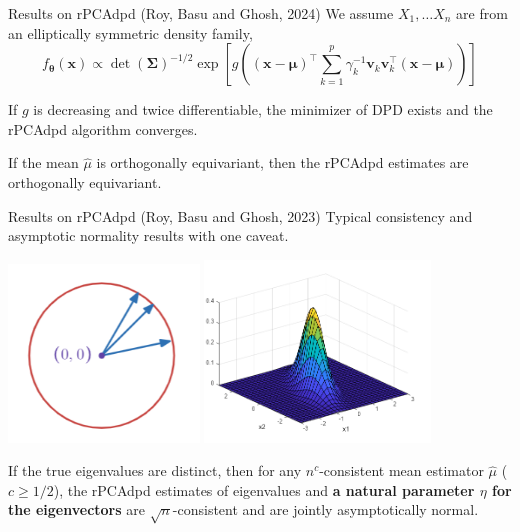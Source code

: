 \documentclass[10pt]{beamer}
\newcommand{\bb}[1]{\boldsymbol{#1}}
\newcommand{\tr}{^{\intercal}}
\begin{document}
\begin{frame}{Results on rPCAdpd (Roy, Basu and Ghosh, 2024)}
    \noindent We assume $X_1, \dots X_n$ are from an elliptically symmetric density family,
    \begin{equation*}
        f_{\bb{\theta}}(\bb{x}) \propto \det(\bb{\Sigma})^{-1/2} \exp\left[ g\left( (\bb{x} - \bb{\mu})\tr \sum_{k=1}^p \gamma_k^{-1}\bb{v}_k\bb{v}_k\tr (\bb{x} - \bb{\mu}) \right) \right]
    \end{equation*}
    
    \begin{tcolorbox}[colback=green!5!white,colframe=green!75!black]
        If $g$ is decreasing and twice differentiable, the minimizer of DPD exists and the rPCAdpd algorithm converges.
    \end{tcolorbox}

    \begin{tcolorbox}[colback=green!5!white,colframe=green!75!black]
        If the mean $\widehat{\mu}$ is orthogonally equivariant, then the rPCAdpd estimates are orthogonally equivariant.
    \end{tcolorbox}
\end{frame}

\begin{frame}{Results on rPCAdpd (Roy, Basu and Ghosh, 2023)}
Typical consistency and asymptotic normality results with one caveat.

{
    \includegraphics[width = 0.38\textwidth]{figures/thesis_slides/circle-eigen.png}
    \hfill
    \includegraphics[width = 0.45\textwidth]{figures/thesis_slides/normal-eigen.png}
}

\pause

\begin{tcolorbox}[colback=green!5!white,colframe=green!75!black]
    If the true eigenvalues are distinct, then for any $n^c$-consistent mean estimator $\widehat{\mu}$ ($c \geq 1/2$), the rPCAdpd estimates of eigenvalues and \textbf{a natural parameter $\eta$ for the eigenvectors} are $\sqrt{n}$-consistent and are jointly asymptotically normal.
\end{tcolorbox}

\end{frame}
\end{document}
